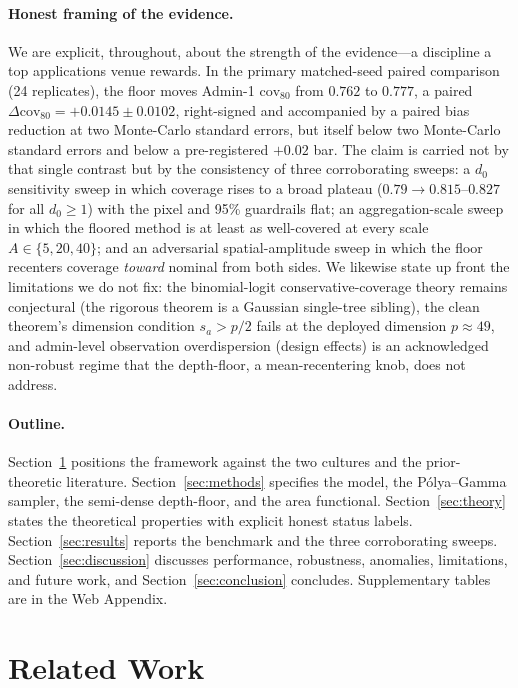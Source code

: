 \documentclass[11pt]{article}
\theoremstyle{remark}
\newcommand{\dz}{d_0}
\newcommand{\cov}{\mathrm{cov}}
\begin{document}
\paragraph{Honest framing of the evidence.}
We are explicit, throughout, about the strength of the evidence---a discipline a
top applications venue rewards. In the primary matched-seed paired comparison
(24 replicates), the floor moves Admin-1 $\cov_{80}$ from $0.762$ to $0.777$, a
paired $\Delta\cov_{80}=+0.0145\pm0.0102$, right-signed and accompanied by a
paired bias reduction at two Monte-Carlo standard errors, but itself below two
Monte-Carlo standard errors and below a pre-registered $+0.02$ bar. The claim is
carried not by that single contrast but by the consistency of three
corroborating sweeps: a $\dz$ sensitivity sweep in which coverage rises to a
broad plateau ($0.79\to 0.815$--$0.827$ for all $\dz\ge1$) with the pixel and 95\%
guardrails flat; an aggregation-scale sweep in which the floored method is at
least as well-covered at every scale $A\in\{5,20,40\}$; and an adversarial
spatial-amplitude sweep in which the floor recenters coverage \emph{toward}
nominal from both sides. We likewise state up front the limitations we do not
fix: the binomial-logit conservative-coverage theory remains conjectural (the
rigorous theorem is a Gaussian single-tree sibling), the clean theorem's
dimension condition $s_a > p/2$ fails at the deployed dimension $p\approx 49$,
and admin-level observation overdispersion (design effects) is an acknowledged
non-robust regime that the depth-floor, a mean-recentering knob, does not address.

\paragraph{Outline.}
Section~\ref{sec:related} positions the framework against the two cultures and
the prior-theoretic literature. Section~\ref{sec:methods} specifies the model,
the P\'olya--Gamma sampler, the semi-dense depth-floor, and the area functional.
Section~\ref{sec:theory} states the theoretical properties with explicit
honest status labels. Section~\ref{sec:results} reports the benchmark and the
three corroborating sweeps. Section~\ref{sec:discussion} discusses performance,
robustness, anomalies, limitations, and future work, and
Section~\ref{sec:conclusion} concludes. Supplementary tables are in the Web
Appendix.

\section{Related Work}\label{sec:related}
\end{document}
